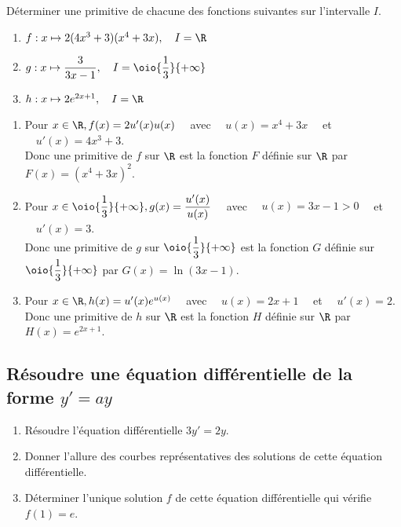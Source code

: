 \documentclass[a4paper,11pt,exos]{nsi} %
\begin{document}
\exo{}
Déterminer une primitive de chacune des fonctions suivantes sur l'intervalle $I$.
\begin{enumerate}
    \item $f:x\mapsto 2(4x^3+3)(x^4+3x), \quad I=\R$
    \item $g:x\mapsto \dfrac{3}{3x-1}, \quad I=\oio{\dfrac{1}{3}}{+\infty}$
    \item $h:x\mapsto 2e^{2x+1}, \quad I=\R$
\end{enumerate}

\textcolor{UGLiBlue}{
    \begin{enumerate}
        \item Pour $x\in\R, f(x)=2u'(x)u(x)\quad$ avec $\quad u(x)=x^4+3x\quad$ et $\quad u'(x)=4x^3+3$.\\
        Donc une primitive de $f$ sur $\R$ est la fonction $F$ définie sur $\R$ par $F(x)=\left(x^4+3x\right)^2$.
        \item Pour $x\in\oio{\dfrac{1}{3}}{+\infty}, g(x)=\dfrac{u'(x)}{u(x)}\quad$ avec $\quad u(x)=3x-1>0\quad$ et $\quad u'(x)=3$.\\
        Donc une primitive de $g$ sur $\oio{\dfrac{1}{3}}{+\infty}$ est la fonction $G$ définie sur $\oio{\dfrac{1}{3}}{+\infty}$ par $G(x)=\ln(3x-1)$.
        \item Pour $x\in\R, h(x)=u'(x)e^{u(x)}\quad$ avec $\quad u(x)=2x+1\quad$ et $\quad u'(x)=2$.\\
        Donc une primitive de $h$ sur $\R$ est la fonction $H$ définie sur $\R$ par $H(x)=e^{2x+1}$.
    \end{enumerate}
}

\newpage

\subsection*{Résoudre une équation différentielle de la forme $y'=ay$}
\exo{}
\begin{enumerate}
    \item Résoudre l'équation différentielle $3y'=2y$.
    \item Donner l'allure des courbes représentatives des solutions de cette équation différentielle.
    \item Déterminer l'unique solution $f$ de cette équation différentielle qui vérifie $f(1)=e$.
\end{enumerate}
\end{document}
